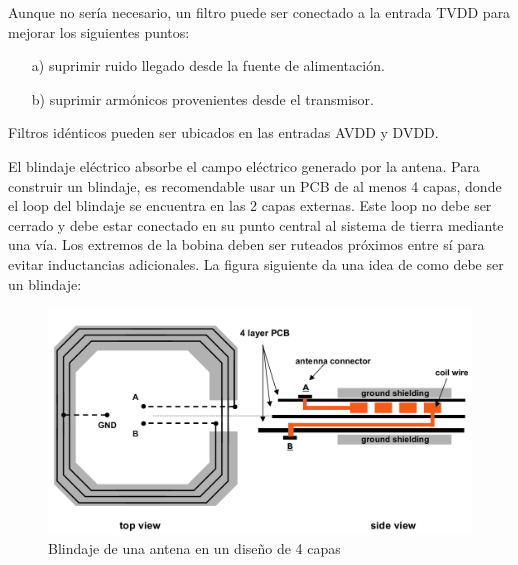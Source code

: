 \bigskip
{}

\bigskip
Aunque no sería necesario, un filtro puede ser conectado a la entrada TVDD para mejorar los siguientes puntos:

\begin{itemize}
\item[a)] suprimir ruido llegado desde la fuente de alimentación.
\item[b)] suprimir armónicos provenientes desde el transmisor.
\end{itemize}

Filtros idénticos pueden ser ubicados en las entradas AVDD y DVDD.

\bigskip
{}

\bigskip
El blindaje eléctrico absorbe el campo eléctrico generado por la antena. Para construir un blindaje, es recomendable usar un PCB de al menos 4 capas, donde el loop del blindaje se encuentra en las 2 capas externas. Este loop no debe ser cerrado y debe estar conectado en su punto central al sistema de tierra mediante una vía. Los extremos de la bobina deben ser ruteados próximos entre sí para evitar inductancias adicionales.  La figura siguiente da una idea de como debe ser un blindaje: 


\begin{figure}[H]
\centering
  \begin{center}
  \includegraphics[scale=.3]{Imagenes/anexo3.png} 
  \end{center}
  \caption{Blindaje de una antena en un diseño de 4 capas}\label{Fig:HW} 
\end{figure}

